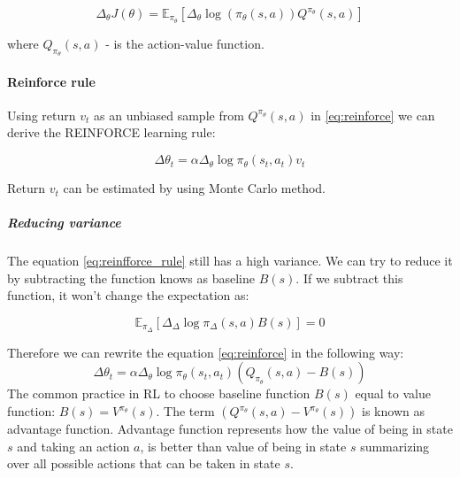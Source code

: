\begin{equation} \label{eq:reinforce}
	\Delta_{\theta} J(\theta) = \mathbb{E}_{\pi_{\theta}}
		[\Delta_{\theta} \log(
		\pi_{\theta}(s, a) )  Q^{\pi_{\theta}}(s, a)]
\end{equation}

where $Q_{\pi_{\theta}}(s, a)$ - is the action-value function.

\paragraph{Reinforce rule}
Using return $v_t$ as an unbiased sample from $Q^{\pi_{\theta}}(s, a)$
in \ref{eq:reinforce} we can derive the REINFORCE learning rule:

\begin{equation} \label{eq:reinfforce_rule}
	\Delta \theta_t = \alpha \Delta_{\theta} \log \pi_{\theta}(s_t, a_t) v_t
\end{equation}


Return $v_t$ can be estimated by using Monte Carlo method.
\subparagraph{Reducing variance} The equation \ref{eq:reinfforce_rule} still has
a high variance. We can try to reduce it by subtracting the function knows as
baseline $B(s)$. If we subtract this function, it won't change the expectation
as:

\begin{equation} \label{eq:bas_0}
	\mathbb{E}_{\pi_{\Delta}} [\Delta_{\Delta} \log \pi_{\Delta}(s, a) B(s)] = 0
\end{equation}

Therefore we can rewrite the equation \ref{eq:reinforce} in the following
way:
\begin{equation}
	\Delta \theta_t = \alpha \Delta_{\theta} \log \pi_{\theta}(s_t, a_t) (Q_{\pi_{\theta}}(s, a) - B(s))
\end{equation}
The common practice in RL to choose baseline function $B(s)$ equal to value function:
 $B(s) = V^{\pi_{\theta}}(s)$. The term $(Q^{\pi_{\theta}}(s, a) -  V^{\pi_{\theta}}(s))$
 is known as advantage function. Advantage function represents how the value
 of being in state $s$ and taking an action $a$, is better than value of being in state $s$
 summarizing over all possible actions that can be taken in state $s$.
%
%

